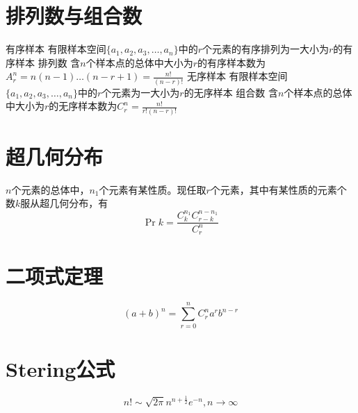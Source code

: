 \documentclass[11pt]{article}
\begin{document}
\begin{sloppypar}
\section{排列数与组合数}
有序样本 \newline
有限样本空间$\{a_1,a_2,a_3,\dots,a_n\}$中的$r$个元素的有序排列为一大小为$r$的有序样本 \newline
\newline
排列数 \newline
含$n$个样本点的总体中大小为$r$的有序样本数为$A^n_r =n(n-1)\dots(n-r+1) =\frac{n!}{(n-r)!}$ \newline
\newline
无序样本 \newline
有限样本空间$\{a_1,a_2,a_3,\dots,a_n\}$中的$r$个元素为一大小为$r$的无序样本 \newline
\newline
组合数 \newline
含$n$个样本点的总体中大小为$r$的无序样本数为$C^n_r = \frac{n!}{r!(n-r)!}$ \newline

\section{超几何分布}
$n$个元素的总体中，$n_1$个元素有某性质。现任取$r$个元素，其中有某性质的元素个数$k$服从超几何分布，有
\begin{equation}
    \Pr{k} = \frac{C^{n_1}_k C^{n-n_1}_{r-k}}{C^n_r}
\end{equation}

\section{二项式定理}
\begin{equation}
    (a+b)^n = \sum_{r=0}^n C^n_r a^rb^{n-r}
\end{equation}

\section{Stering公式}
\begin{equation}
    n! \sim \sqrt{2\pi} n^{n+\frac{1}{2}} e^{-n}, n \rightarrow \infty
\end{equation}

\end{sloppypar}
\end{document}
